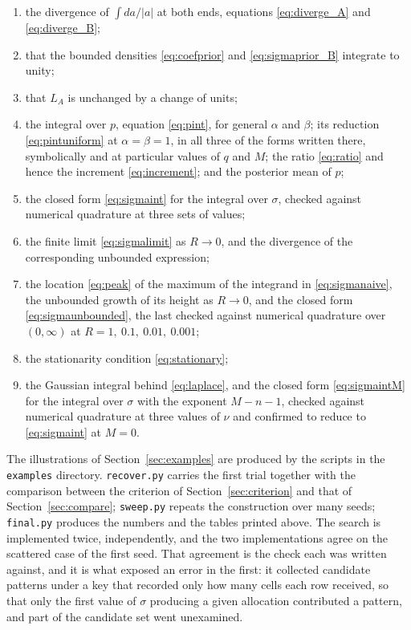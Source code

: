 \begin{enumerate}
\item the divergence of $\int da/|a|$ at both ends, equations
      \eqref{eq:diverge_A} and \eqref{eq:diverge_B};
\item that the bounded densities \eqref{eq:coefprior} and \eqref{eq:sigmaprior_B}
      integrate to unity;
\item that $L_{A}$ is unchanged by a change of units;
\item the integral over $p$, equation \eqref{eq:pint}, for general $\alpha$ and
      $\beta$; its reduction \eqref{eq:pintuniform} at $\alpha = \beta = 1$, in all
      three of the forms written there, symbolically and at particular values of $q$
      and $M$; the ratio \eqref{eq:ratio} and hence the increment
      \eqref{eq:increment}; and the posterior mean of $p$;
\item the closed form \eqref{eq:sigmaint} for the integral over $\sigma$, checked
      against numerical quadrature at three sets of values;
\item the finite limit \eqref{eq:sigmalimit} as $R \to 0$, and the divergence of the
      corresponding unbounded expression;
\item the location \eqref{eq:peak} of the maximum of the integrand in
      \eqref{eq:sigmanaive}, the unbounded growth of its height as $R \to 0$, and the
      closed form \eqref{eq:sigmaunbounded}, the last checked against numerical
      quadrature over $(0,\infty)$ at $R = 1,\ 0.1,\ 0.01,\ 0.001$;
\item the stationarity condition \eqref{eq:stationary};
\item the Gaussian integral behind \eqref{eq:laplace}, and the closed form
      \eqref{eq:sigmaintM} for the integral over $\sigma$ with the exponent
      $M-n-1$, checked against numerical quadrature at three values of $\nu$ and
      confirmed to reduce to \eqref{eq:sigmaint} at $M = 0$.
\end{enumerate}

The illustrations of Section~\ref{sec:examples} are produced by the scripts in the
\texttt{examples} directory. \texttt{recover.py} carries the first trial together
with the comparison between the criterion of Section~\ref{sec:criterion} and that of
Section~\ref{sec:compare}; \texttt{sweep.py} repeats the construction over many
seeds; \texttt{final.py} produces the numbers and the tables printed above. The
search is implemented twice, independently, and the two implementations agree on the
scattered case of the first seed. That agreement is the check each was written
against, and it is what exposed an error in the first: it collected candidate
patterns under a key that recorded only how many cells each row received, so that
only the first value of $\sigma$ producing a given allocation contributed a pattern,
and part of the candidate set went unexamined.

